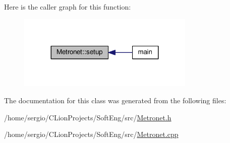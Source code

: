 Here is the caller graph for this function\+:\nopagebreak
\begin{figure}[H]
\begin{center}
\leavevmode
\includegraphics[width=239pt]{class_metronet_ad12d6e52c7f5c23d23e87992b4abc1fa_icgraph}
\end{center}
\end{figure}


The documentation for this class was generated from the following files\+:\begin{DoxyCompactItemize}
\item 
/home/sergio/\+C\+Lion\+Projects/\+Soft\+Eng/src/\hyperlink{_metronet_8h}{Metronet.\+h}\item 
/home/sergio/\+C\+Lion\+Projects/\+Soft\+Eng/src/\hyperlink{_metronet_8cpp}{Metronet.\+cpp}\end{DoxyCompactItemize}
